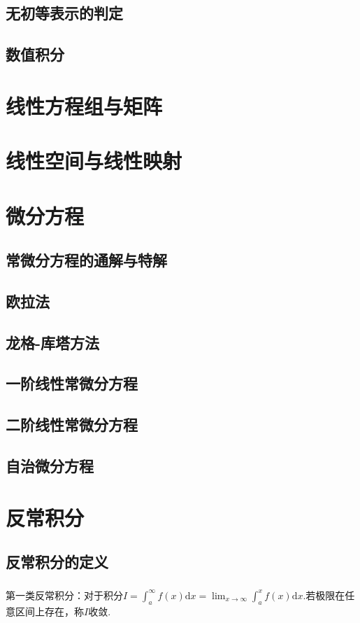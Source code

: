 \documentclass[12pt,a4paper,UTF8]{ctexbook}
\theoremstyle{plain}
\begin{document}
\section{无初等表示的判定}
\section{数值积分}

\chapter{线性方程组与矩阵}
\chapter{线性空间与线性映射}

\chapter{微分方程}
\section{常微分方程的通解与特解}
\section{欧拉法}
\section{龙格-库塔方法}
\section{一阶线性常微分方程}
\section{二阶线性常微分方程}
\section{自治微分方程}

\chapter{反常积分}
\section{反常积分的定义}
\paragraph{}第一类反常积分：对于积分$I=\int_a^\infty f(x)\mathrm{d}x=\lim_{x\to \infty}\int_a^xf(x)\mathrm{d}x.$若极限在任意区间上存在，称$I$收敛.
\end{document}
